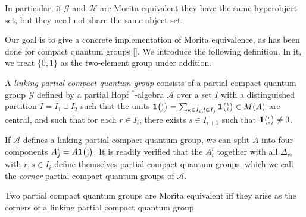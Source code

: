 In particular, if $\mathscr{G}$ and $\mathscr{H}$ are Morita equivalent they have the same hyperobject set, but they need not share the same object set.

Our goal is to give a concrete implementation of Morita equivalence, as has been done for compact quantum groups []. We introduce the following definition. In it, we treat $\{0,1\}$ as the two-element group under addition.

\begin{Def} A \emph{linking partial compact quantum group} consists of a partial compact quantum group $\mathscr{G}$ defined by a partial Hopf $^*$-algebra $\mathscr{A}$ over a set $I$ with a distinguished partition $I = I_1\sqcup I_2$ such that the units $\mathbf{1}{\tiny {\begin{pmatrix} i\\j\end{pmatrix}}} = \sum_{k\in I_i,l\in I_j} \mathbf{1}{\tiny {\begin{pmatrix} k\\l\end{pmatrix}}} \in M(A)$ are central, and such that for each $r\in I_i$, there exists $s\in I_{i+1}$ such that $\mathbf{1}{\tiny {\begin{pmatrix} r\\s\end{pmatrix}}}\neq 0$.
\end{Def}

If $\mathscr{A}$ defines a linking partial compact quantum group, we can split $A$ into four components $A^i_j = A\mathbf{1}{\tiny {\begin{pmatrix} i\\j\end{pmatrix}}}$. It is readily verified that the $A^i_i$ together with all $\Delta_{rs}$ with $r,s \in I_i$ define themselves partial compact quantum groups, which we call the \emph{corner} partial compact quantum groups of $\mathscr{A}$. 

\begin{Prop} Two partial compact quantum groups are Morita equivalent iff they arise as the corners of a linking partial compact quantum group.
\end{Prop}

